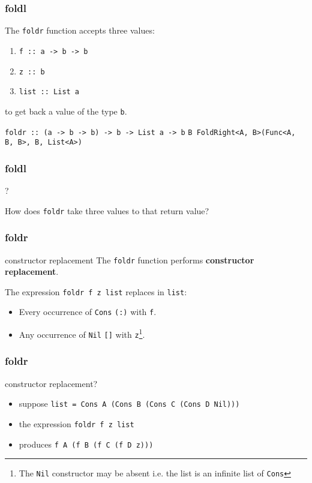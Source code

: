 \begin{frame}
\frametitle{foldl}
The \lstinline[basicstyle=\ttfamily]$foldr$ function accepts three values:
\begin{enumerate}
\item \lstinline[basicstyle=\ttfamily]$f :: a -> b -> b$
\item \lstinline[basicstyle=\ttfamily]$z :: b$
\item \lstinline[basicstyle=\ttfamily]$list :: List a$
\end{enumerate}
to get back a value of the type \lstinline[basicstyle=\ttfamily]$b$.

\hrulefill

\lstinline[basicstyle=\ttfamily]$foldr :: (a -> b -> b) -> b -> List a -> b$
\lstinline[basicstyle=\ttfamily]$B FoldRight<A, B>(Func<A, B, B>, B, List<A>)$
\end{frame}

\begin{frame}
\frametitle{foldl}
\begin{block}{?}
\begin{center}
How does \lstinline[basicstyle=\ttfamily]$foldr$ take three values to that return value?
\end{center}
\end{block}
\end{frame}

\begin{frame}
\frametitle{foldr}
\begin{block}{constructor replacement}
The \lstinline[basicstyle=\ttfamily]$foldr$ function performs \textbf{constructor replacement}.
\end{block}
The expression \lstinline[basicstyle=\ttfamily]$foldr f z list$ replaces in \lstinline[basicstyle=\ttfamily]$list$:
\begin{itemize}
\item Every occurrence of \lstinline{Cons} \lstinline[basicstyle=\ttfamily]$(:)$ with \lstinline[basicstyle=\ttfamily]$f$.
\item Any occurrence of \lstinline{Nil} \lstinline[basicstyle=\ttfamily]$[]$ with \lstinline[basicstyle=\ttfamily]$z$\footnote{The \lstinline{Nil} constructor may be absent \textemdash i.e. the list is an infinite list of \lstinline{Cons}}.
\end{itemize}
\end{frame}

\begin{frame}
\frametitle{foldr}
\begin{block}{constructor replacement?}
\small
\begin{itemize}
\item suppose \lstinline[basicstyle=\ttfamily]$list = Cons A (Cons B (Cons C (Cons D Nil)))$
\item the expression \lstinline[basicstyle=\ttfamily, mathescape]!foldr f z list!
\item produces \lstinline[basicstyle=\ttfamily]$f A (f B (f C (f D z)))$
\end{itemize}
\end{block}
\end{frame}

